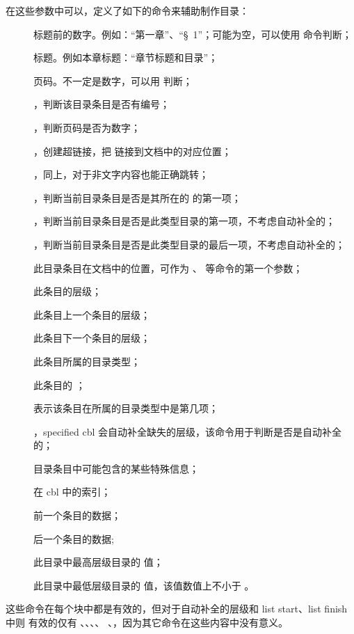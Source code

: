 \documentclass[twoside]{book}
\begin{document}
在这些参数中可以，定义了如下的命令来辅助制作目录：
\begin{description}
  \item[\cmd\tocthenumber] 标题前的数字。例如：“第一章”、“\S~1”；可能为空，可以使用 \cmd{\tocifnumbered} 命令判断；
  \item[\cmd\tocthename] 标题。例如本章标题：“章节标题和目录”；
  \item[\cmd\tocthepage] 页码。不一定是数字，可以用 \cmd{\tocifpageisnumber} 判断；
  \item[\cmd\tocifnumbered]，判断该目录条目是否有编号；
  \item[\cmd\tocifpageisnumber]，判断页码是否为数字；
  \item[\cmd\toclink]，创建超链接，把  链接到文档中的对应位置；
  \item[\cmd\toclinkbox]，同上，对于非文字内容也能正确跳转；
  \item[\cmd\tociffirst]，判断当前目录条目是否是其所在的  的第一项；
  \item[\cmd\tocifheadentry]，判断当前目录条目是否是此类型目录的第一项，不考虑自动补全的；
  \item[\cmd\tociftailentry]，判断当前目录条目是否是此类型目录的最后一项，不考虑自动补全的；
  \item[\cmd\toctheanchor] 此目录条目在文档中的位置，可作为 、 等命令的第一个参数；
  \item[\cmd\tocthelevel] 此条目的层级；
  \item[\cmd\toctheprevlevel] 此条目上一个条目的层级；
  \item[\cmd\tocthenextlevel] 此条目下一个条目的层级；
  \item[\cmd\tocthetype] 此条目所属的目录类型；
  \item[\cmd\toctheclass] 此条目的 ；
  \item[\cmd\toctheindex] 表示该条目在所属的目录类型中是第几项；
  \item[\cmd\tocifcomplement]，specified cbl 会自动补全缺失的层级，该命令用于判断是否是自动补全的；
  \item[\cmd\tocthetags] 目录条目中可能包含的某些特殊信息；
  \item[\cmd\tocthecount] 在 cbl 中的索引；
  \item[\cmd\tocthepreventry] 前一个条目的数据；
  \item[\cmd\tocthenextentry] 后一个条目的数据;
  \item[\cmd\tochilevel] 此目录中最高层级目录的  值；
  \item[\cmd\toclolevel] 此目录中最低层级目录的  值，该值数值上不小于 。
\end{description}
这些命令在每个块中都是有效的，但对于自动补全的层级和 list start、list finish 中则
有效的仅有 \cmd\tocthelevel、\cmd\toctheclass、\cmd\tocifcomplement、\cmd\tocthetype、
\cmd\tochilevel、\cmd\toclolevel，因为其它命令在这些内容中没有意义。
\end{document}
